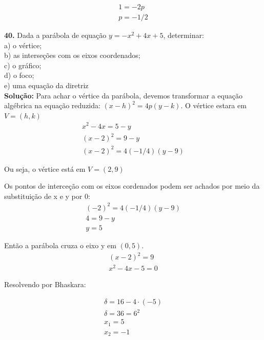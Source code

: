 \begin{equation}
    \begin{split}
        1 = -2p \\
        p = -1/2
    \end{split}
\end{equation}

\textbf{40.} Dada a parábola de equação $y=-x^2 + 4x + 5$, determinar: \\
a) o vértice; \\
b) as interseções com os eixos coordenados; \\
c) o gráfico; \\
d) o foco; \\
e) uma equação da diretriz \\

\textbf{Solução:} Para achar o vértice da parábola, devemos transformar a equação algébrica na equação reduzida: $(x-h)^2 = 4p(y-k)$. O vértice estara em $V = (h, k)$
\begin{equation}
    \begin{split}
        x^2 - 4x = 5 - y \\
        (x-2)^2 = 9 - y \\
        (x-2)^2 = 4(-1/4)(y - 9)
    \end{split}
\end{equation}

Ou seja, o vértice está em $V = (2, 9)$

Os pontos de interceção com os eixos cordenados podem ser achados por meio da substituição de x e y por 0:
\begin{equation}
    \begin{split}
        (-2)^2 = 4(-1/4)(y - 9) \\
        4 = 9 - y \\
        y = 5
    \end{split}
\end{equation}

Então a parábola cruza o eixo y em $(0, 5)$.
\begin{equation}
    \begin{split}
        (x-2)^2 = 9 \\
        x^2 - 4x - 5 = 0
    \end{split}
\end{equation}

Resolvendo por Bhaskara:

\begin{equation}
    \begin{split}
        \delta = 16 -4 \cdot (-5) \\
        \delta = 36 = 6^2 \\
        x_1 = 5 \\
        x_2 = -1
    \end{split}
\end{equation}

